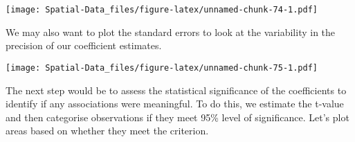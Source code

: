 \documentclass[
]{book}
\newenvironment{Shaded}{\begin{snugshade}}{\end{snugshade}}
\newcommand{\AttributeTok}[1]{\textcolor[rgb]{0.77,0.63,0.00}{#1}}
\newcommand{\CommentTok}[1]{\textcolor[rgb]{0.56,0.35,0.01}{\textit{#1}}}
\newcommand{\DecValTok}[1]{\textcolor[rgb]{0.00,0.00,0.81}{#1}}
\newcommand{\FunctionTok}[1]{\textcolor[rgb]{0.00,0.00,0.00}{#1}}
\newcommand{\NormalTok}[1]{#1}
\newcommand{\OtherTok}[1]{\textcolor[rgb]{0.56,0.35,0.01}{#1}}
\newcommand{\SpecialCharTok}[1]{\textcolor[rgb]{0.00,0.00,0.00}{#1}}
\newcommand{\StringTok}[1]{\textcolor[rgb]{0.31,0.60,0.02}{#1}}
\begin{document}
\texttt{[image: Spatial-Data\_files/figure-latex/unnamed-chunk-74-1.pdf]}

We may also want to plot the standard errors to look at the variability in the precision of our coefficient estimates.

\begin{Shaded}
\end{Shaded}

\texttt{[image: Spatial-Data\_files/figure-latex/unnamed-chunk-75-1.pdf]}

The next step would be to assess the statistical significance of the coefficients to identify if any associations were meaningful. To do this, we estimate the t-value and then categorise observations if they meet 95\% level of significance. Let's plot areas based on whether they meet the criterion.
\end{document}
